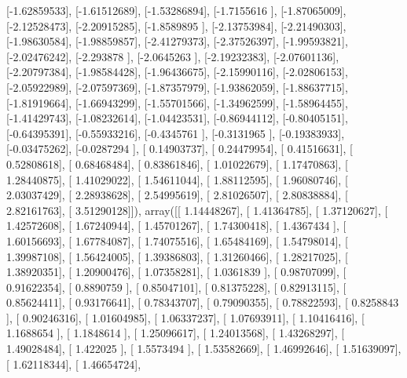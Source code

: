 \documentclass{article}
\begin{document}
       [-1.62859533],
       [-1.61512689],
       [-1.53286894],
       [-1.7155616 ],
       [-1.87065009],
       [-2.12528473],
       [-2.20915285],
       [-1.8589895 ],
       [-2.13753984],
       [-2.21490303],
       [-1.98630584],
       [-1.98859857],
       [-2.41279373],
       [-2.37526397],
       [-1.99593821],
       [-2.02476242],
       [-2.293878  ],
       [-2.0645263 ],
       [-2.19232383],
       [-2.07601136],
       [-2.20797384],
       [-1.98584428],
       [-1.96436675],
       [-2.15990116],
       [-2.02806153],
       [-2.05922989],
       [-2.07597369],
       [-1.87357979],
       [-1.93862059],
       [-1.88637715],
       [-1.81919664],
       [-1.66943299],
       [-1.55701566],
       [-1.34962599],
       [-1.58964455],
       [-1.41429743],
       [-1.08232614],
       [-1.04423531],
       [-0.86944112],
       [-0.80405151],
       [-0.64395391],
       [-0.55933216],
       [-0.4345761 ],
       [-0.3131965 ],
       [-0.19383933],
       [-0.03475262],
       [-0.0287294 ],
       [ 0.14903737],
       [ 0.24479954],
       [ 0.41516631],
       [ 0.52808618],
       [ 0.68468484],
       [ 0.83861846],
       [ 1.01022679],
       [ 1.17470863],
       [ 1.28440875],
       [ 1.41029022],
       [ 1.54611044],
       [ 1.88112595],
       [ 1.96080746],
       [ 2.03037429],
       [ 2.28938628],
       [ 2.54995619],
       [ 2.81026507],
       [ 2.80838884],
       [ 2.82161763],
       [ 3.51290128]]), array([[ 1.14448267],
       [ 1.41364785],
       [ 1.37120627],
       [ 1.42572608],
       [ 1.67240944],
       [ 1.45701267],
       [ 1.74300418],
       [ 1.4367434 ],
       [ 1.60156693],
       [ 1.67784087],
       [ 1.74075516],
       [ 1.65484169],
       [ 1.54798014],
       [ 1.39987108],
       [ 1.56424005],
       [ 1.39386803],
       [ 1.31260466],
       [ 1.28217025],
       [ 1.38920351],
       [ 1.20900476],
       [ 1.07358281],
       [ 1.0361839 ],
       [ 0.98707099],
       [ 0.91622354],
       [ 0.8890759 ],
       [ 0.85047101],
       [ 0.81375228],
       [ 0.82913115],
       [ 0.85624411],
       [ 0.93176641],
       [ 0.78343707],
       [ 0.79090355],
       [ 0.78822593],
       [ 0.8258843 ],
       [ 0.90246316],
       [ 1.01604985],
       [ 1.06337237],
       [ 1.07693911],
       [ 1.10416416],
       [ 1.1688654 ],
       [ 1.1848614 ],
       [ 1.25096617],
       [ 1.24013568],
       [ 1.43268297],
       [ 1.49028484],
       [ 1.422025  ],
       [ 1.5573494 ],
       [ 1.53582669],
       [ 1.46992646],
       [ 1.51639097],
       [ 1.62118344],
       [ 1.46654724],
\end{document}
